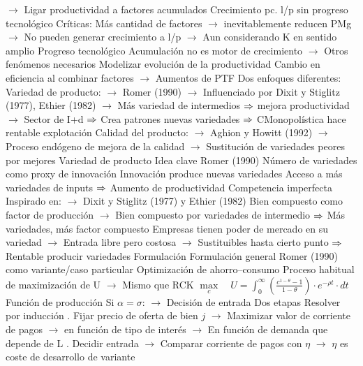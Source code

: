 \documentclass{nuevotema}
\begin{document}
\begin{esquemal}
				\4[] $\to$ Ligar productividad a factores acumulados
				\4[$\then$] Crecimiento pc. l/p sin progreso tecnológico
				\4 Críticas:
				\4[] Más cantidad de factores
				\4[] $\to$ inevitablemente reducen PMg
				\4[] $\to$ No pueden generar crecimiento a l/p
				\4[] $\to$ Aun considerando K en sentido amplio
			\3 Progreso tecnológico
				\4 Acumulación no es motor de crecimiento
				\4[] $\to$ Otros fenómenos necesarios
				\4 Modelizar evolución de la productividad
				\4[] Cambio en eficiencia al combinar factores
				\4[] $\to$ Aumentos de PTF
				\4 Dos enfoques diferentes:
				\4[] Variedad de producto:
				\4[] $\to$ Romer (1990)
				\4[] $\to$ Influenciado por Dixit y Stiglitz (1977), Ethier (1982)
				\4[] $\to$ Más variedad de intermedios
				\4[] $\then$ mejora productividad
				\4[] $\to$ Sector de I+d
				\4[] $\then$ Crea patrones nuevas variedades
				\4[] $\then$ CMonopolística hace rentable explotación
				\4[] Calidad del producto:
				\4[] $\to$ Aghion y Howitt (1992)
				\4[] $\to$ Proceso endógeno de mejora de la calidad
				\4[] $\to$ Sustitución de variedades peores por mejores
		\2 Variedad de producto
			\3 Idea clave
				\4 Romer (1990)
				\4 Número de variedades como proxy de innovación
				\4[] Innovación produce nuevas variedades
				\4[] Acceso a más variedades de inputs
				\4[] $\then$ Aumento de productividad
				\4 Competencia imperfecta
				\4[] Inspirado en:
				\4[] $\to$ Dixit y Stiglitz (1977) y Ethier (1982)
				\4[] Bien compuesto como factor de producción
				\4[] $\to$ Bien compuesto por variedades de intermedio
				\4[] $\then$ Más variedades, más factor compuesto
				\4[] Empresas tienen poder de mercado en su variedad
				\4[] $\to$ Entrada libre pero costosa
				\4[] $\to$ Sustituibles hasta cierto punto
				\4[] $\then$ Rentable producir variedades
			\3 Formulación
				\4 Formulación general
				\4[] Romer (1990) como variante/caso particular
				\4 Optimización de ahorro--consumo
				\4[] Proceso habitual de maximización de U
				\4[] $\to$ Mismo que RCK
				\4[] $\underset{c}{\max} \quad U= \int_0^\infty \left( \frac{c^{1-\theta}-1}{1-\theta} \right) \cdot e^{-\rho t} \cdot dt$
				\4 Función de producción
				\4[] 
				\4[] Si $\alpha = \sigma$:
				\4[] $\to$ 
				\4 Decisión de entrada
				\4[] Dos etapas
				\4[] Resolver por inducción
				. Fijar precio de oferta de bien $j$
				\4[] $\to$ Maximizar valor de corriente de pagos
				\4[] $\to$ en función de tipo de interés
				\4[] $\to$ En función de demanda que depende de L
				. Decidir entrada
				\4[] $\to$ Comparar corriente de pagos con $\eta$
				\4[] $\to$ $\eta$ es coste de desarrollo de variante


\end{esquemal}
\end{document}
